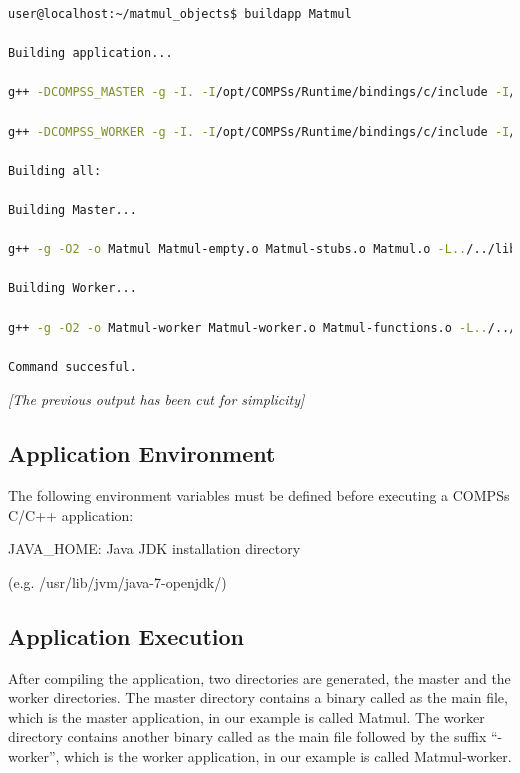 \begin{lstlisting}[language=bash]
user@localhost:~/matmul_objects$ buildapp Matmul

Building application...

g++ -DCOMPSS_MASTER -g -I. -I/opt/COMPSs/Runtime/bindings/c/include -I/opt/COMPSs/Runtime/bindings/bindings-common/include -c Block.cc Matrix.cc ar rvs libmaster.a Block.o Matrix.o

g++ -DCOMPSS_WORKER -g -I. -I/opt/COMPSs/Runtime/bindings/c/include -I/opt/COMPSs/Runtime/bindings/bindings-common/include -c Block.cc Matrix.cc ar rvs libworker.a Block.o Matrix.o

Building all:

Building Master...

g++ -g -O2 -o Matmul Matmul-empty.o Matmul-stubs.o Matmul.o -L../../lib -lmaster -L/usr/lib/jvm/java-6-openjdk-amd64/jre/lib/amd64/server -ljvm -ldl -L/opt/COMPSs/Runtime/bindings/c/../bindings-common/lib -lbindings_common -L/opt/COMPSs/Runtime/bindings/c/lib -lcbindings -lboost_iostreams -lboost_serialization

Building Worker...

g++ -g -O2 -o Matmul-worker Matmul-worker.o Matmul-functions.o -L../../lib -lworker -ldl -lboost_iostreams -lboost_serialization -L/opt/COMPSs/Runtime/bindings/c/lib

Command succesful.
\end{lstlisting}

\emph{[The previous output has been cut for simplicity]}

\subsection{Application Environment}
The following environment variables must be defined before executing a COMPSs C/C++ application:
            
\begin{center}
JAVA\_HOME: Java JDK installation directory 

(e.g. /usr/lib/jvm/java-7-openjdk/)
\end{center}


\subsection{Application Execution}
After compiling the application, two directories are generated, the master and the worker directories. 
The master directory contains a binary called as the main file, which is the master application, in our 
example is called Matmul. The worker directory contains another binary called as the main file followed 
by the suffix ``-worker'', which is the worker application, in our example is called Matmul-worker.

